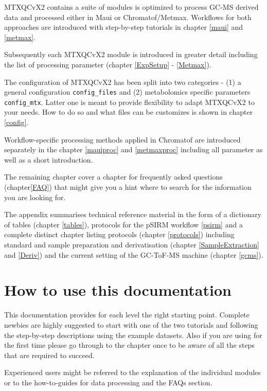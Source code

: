 \documentclass[]{book}
\begin{document}
MTXQCvX2 contains a suite of modules is optimized to process GC-MS derived data and processed either in Maui or Chromatof/Metmax. Workflows for both approaches are introduced with step-by-step tutorials in chapter \ref{maui} and \ref{metmax}.

Subsequently each MTXQCvX2 module is introduced in greater detail including the list of processing parameter (chapter \ref{ExpSetup} - \ref{Metmax}).

The configuration of MTXQCvX2 has been split into two categories - (1) a general configuration \texttt{config\_files} and (2) metabolomics specific parameters \texttt{config\_mtx}. Latter one is meant to provide flexibility to adapt MTXQCvX2 to your needs. How to do so and what files can be customizes is shown in chapter \ref{config}.

Workflow-specific processing methods applied in Chromatof are introduced separately in the chapter \ref{mauiproc} and \ref{metmaxproc} including all parameter as well as a short introduction.

The remaining chapter cover a chapter for frequently asked questions (chapter\ref{FAQ}) that might give you a hint where to search for the information you are looking for.

The appendix summarises technical reference material in the form of a dictionary of tables (chapter \ref{tables}), protocols for the pSIRM workflow \ref{psirm} and a complete distinct chapter listing protocols (chapter \ref{protocols}) including standard and sample preparation and derivatisation (chapter \ref{SampleExtraction} and \ref{Deriv}) and the current setting of the GC-ToF-MS machine (chapter \ref{gcms}).

\hypertarget{how-to-use-this-documentation}{%
\section{How to use this documentation}\label{how-to-use-this-documentation}}

This documentation provides for each level the right starting point. Complete newbies are highly suggested to start with one of the two tutorials and following the step-by-step descriptions using the example datasets.
Also if you are using for the first time please go through to the chapter once to be aware of all the steps that are required to succeed.

Experienced users might be referred to the explanation of the individual modules or to the how-to-guides for data processing and the FAQs section.
\end{document}
